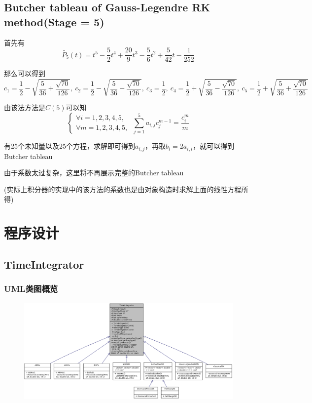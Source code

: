 \documentclass{article}
\begin{document}
\subsection{Butcher tableau of Gauss-Legendre RK method(Stage = 5)}

首先有$$\tilde{P_5}(t) = t^{5} - \frac{5}{2}t^{4} + \frac{20}{9}t^3 - \frac{5}{6}t^2 + \frac{5}{42}t - \frac{1}{252} $$

那么可以得到$$c_1 = \frac{1}{2} - \sqrt{\frac{5}{36}+\frac{\sqrt{70}}{126}},\ c_2 = \frac{1}{2} - \sqrt{\frac{5}{36}-\frac{\sqrt{70}}{126}},\ c_3 = \frac{1}{2},\ c_4 = \frac{1}{2} + \sqrt{\frac{5}{36}-\frac{\sqrt{70}}{126}},\ c_5 = \frac{1}{2} + \sqrt{\frac{5}{36}+\frac{\sqrt{70}}{126}}$$

由该法方法是$C(5)$可以知
$$
\begin{cases}
\forall i = 1,2,3,4,5, \\
\forall m = 1,2,3,4,5,
\end{cases}
\ \sum_{j=1}^{5} a_{i,j}c_j^{m-1} = \frac{c_i^m}{m}
$$

有25个未知量以及25个方程，求解即可得到$a_{i,j}$，再取$b_i = 2a_{i,i}$，就可以得到Butcher tableau

由于系数太过复杂，这里将不再展示完整的Butcher tableau

(实际上积分器的实现中的该方法的系数也是由对象构造时求解上面的线性方程所得)

\newpage

\section{程序设计}

\subsection{TimeIntegrator}

\subsubsection{UML类图概览}
\begin{figure}[ht]
    \centering
    \includegraphics[width = \linewidth]{UML.png}
\end{figure}
\end{document}
